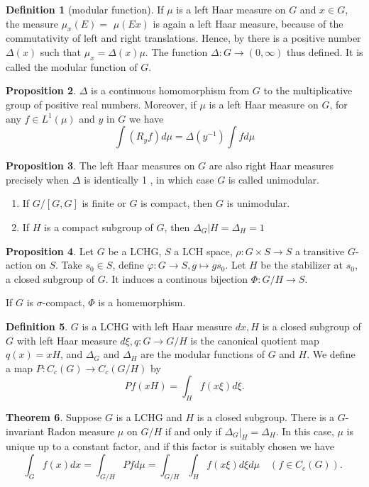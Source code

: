 \documentclass[12pt,a4paper]{book}
\newenvironment{enu}{\begin{enumerate}[(1)]}{\end{enumerate}}
\theoremstyle{definition}
\newtheorem{defn}{Definition}[section]
\newtheorem{theo}[defn]{Theorem}
\newtheorem{prop}[defn]{Proposition}
\begin{document}
\begin{defn}[modular function]
    If $\mu$ is a left Haar measure on $G$ and $x \in G$, the measure $\mu_x(E)=$ $\mu(E x)$ is again a left Haar measure,
    because of the commutativity of left and right translations. Hence, by there is a positive number $\Delta(x)$ such that $\mu_x=\Delta(x) \mu$. The function $\Delta: G \rightarrow(0, \infty)$ thus defined. It is called the modular function of $G$.
\end{defn}
\begin{prop}
    $\Delta$ is a continuous homomorphism from $G$ to the multiplicative group of positive real numbers. Moreover, if $\mu$ is a left Haar measure on $G$, for any $f \in L^1(\mu)$ and $y$ in $G$ we have
    $$
        \int\left(R_y f\right) d \mu=\Delta\left(y^{-1}\right) \int f d \mu
    $$
\end{prop}
\begin{prop}
    The left Haar measures on $G$ are also right Haar measures precisely when $\Delta$ is identically 1 , in which case $G$ is called unimodular.
    \begin{enu}
        \item If $G /[G, G]$ is finite or  $G$ is compact, then $G$ is unimodular.
        \item If $H$ is a compact subgroup of $G$, then $\Delta_G|H=\Delta_H=1$
    \end{enu}

\end{prop}
\begin{prop}
    Let $G$ be a LCHG, $S$ a LCH space, $\rho:G\times S\rightarrow S$ a transitive $G$-action on $S$.
    Take $s_0\in S$, define $\varphi: G\rightarrow S, g\mapsto gs_0$. Let $H$ be the stabilizer at $s_0$, a closed subgroup of $G$.
    It induces a continous bijection $\Phi:G/H\rightarrow S$.

    If $G$ is $\sigma$-compact, $\Phi$ is a homemorphism.
\end{prop}
\begin{defn}
    $G$ is a LCHG with left Haar measure $d x, H$
    is a closed subgroup of $G$ with left Haar measure $d \xi, q: G \rightarrow G / H$ is the canonical quotient map $q(x)=x H$, and $\Delta_G$ and $\Delta_H$ are the modular functions of $G$ and $H$. 
    We define a map $P: C_c(G) \rightarrow C_c(G / H)$ by
    $$
        P f(x H)=\int_H f(x \xi) d \xi .
    $$
\end{defn}
\begin{theo}
    Suppose $G$ is a LCHG and $H$ is a closed subgroup. There is a $G$-invariant Radon measure $\mu$ on $G / H$ if and only if $\left.\Delta_G\right|_H=\Delta_H$. In this case, $\mu$ is unique up to a constant factor, and if this factor is suitably chosen we have 
    $$
        \int_G f(x) d x=\int_{G / H} Pf d \mu=\int_{G / H} \int_H f(x \xi) d \xi d \mu \quad\left(f \in C_c(G)\right) \text {. }
    $$
    \label{theorem: decomposition of Haar measure}
\end{theo}
\end{document}
